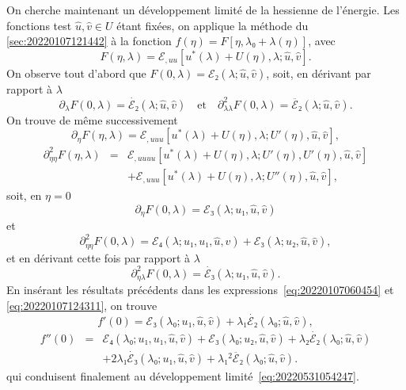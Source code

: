 \documentclass[12pt, final]{amsart}
\theoremstyle{definition}
\begin{document}
On cherche maintenant un développement limité de la hessienne de l'énergie. Les fonctions test \(\hat{u}, \hat{v}∈U\) étant fixées, on applique la méthode du {\textsection}\ref{sec:20220107121442} à la fonction \(f(η) = F [η, λ₀ + λ(η)]\), avec
\begin{equation} F(η, λ) =ℰ_{, u u} [u^{\ast}(λ) + U
 (η), λ; \hat{u}, \hat{v}] . \end{equation}
On observe tout d'abord que \(F(0, λ) =ℰ₂(λ; \hat{u}, \hat{v})\), soit, en dérivant par rapport à \(λ\)
\begin{equation} ∂_{λ} F(0, λ) = \dot{ℰ₂}(λ; \hat{u},
  \hat{v}) \quad \text{et} \quad ∂_{λ λ}^2 F(0,
  λ) = \ddot{ℰ₂}(λ; \hat{u}, \hat{v}) . \end{equation}
On trouve de même successivement
\begin{equation} ∂_{η} F(η, λ) =ℰ_{, u u u}
  [u^{\ast}(λ) + U(η), λ; U'(η), \hat{u}, \hat{v}], \end{equation}
\begin{eqnarray}
 ∂_{η η}^2 F(η, λ) & = & ℰ_{, u
  u u u} [u^{\ast}(λ) + U(η), λ ;
 U'(η), U'(η), \hat{u}, \hat{v}] \\
 & & +ℰ_{, u u u} [u^{\ast}(λ)
 + U(η), λ; U''(η), \hat{u}, \hat{v}],
\end{eqnarray}
soit, en \(η = 0\)
\begin{equation} ∂_{η} F(0, λ) =ℰ₃(λ; u₁, \hat{u},
  \hat{v}) \text{} \end{equation}
et
\begin{equation} ∂_{η η}^2 F(0, λ) =ℰ₄(λ ;
  u₁, u₁, \hat{u}, \hat{v}) +ℰ₃(λ; u₂, \hat{u},
  \hat{v}), \end{equation}
et en dérivant cette fois par rapport à \(λ\)
\begin{equation} ∂_{η λ}^2 F(0, λ) = \dot{ℰ₃}
 (λ; u₁, \hat{u}, \hat{v}) . \end{equation}
En insérant les résultats précédents dans les expressions~\eqref{eq:20220107060454} et \eqref{eq:20220107124311}, on trouve
\begin{equation} f'(0) =ℰ₃(λ₀; u₁, \hat{u}, \hat{v}) + λ₁
  \dot{ℰ₂}(λ₀; \hat{u}, \hat{v}), \end{equation}
\begin{eqnarray}
 f''(0) & = & ℰ₄(λ₀; u₁, u₁, \hat{u}, \hat{v})
 +ℰ₃(λ₀; u₂, \hat{u}, \hat{v}) + λ₂
 \dot{ℰ₂}(λ₀; \hat{u}, \hat{v}) \\
 & &  + 2 λ₁ \dot{ℰ₃}(λ₀ ;
 u₁, \hat{u}, \hat{v}) + λ₁^2 \ddot{ℰ₂}(λ₀ ;
 \hat{u}, \hat{v}) .
\end{eqnarray}
qui conduisent finalement au développement limité~\eqref{eq:20220531054247}.
\end{document}
